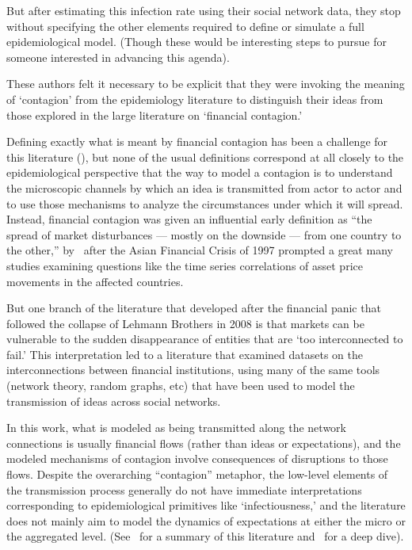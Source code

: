 But after estimating this infection rate using their social network data, they stop without specifying the other elements required to define or simulate a full epidemiological model.  (Though these would be interesting steps to pursue for someone interested in advancing this agenda).

These authors felt it necessary to be explicit that they were invoking the meaning of `contagion' from the epidemiology literature to distinguish their ideas from those explored in the large literature on `financial contagion.'

Defining exactly what is meant by financial contagion has been a challenge for this literature (\cite{pericoli2003primer}),  but none of the usual definitions correspond at all closely to the epidemiological perspective that the way to model a contagion is to understand the microscopic channels by which an idea is transmitted from actor to actor and to use those mechanisms to analyze the circumstances under which it will spread.  Instead, financial contagion was given an influential early definition as ``the spread of market disturbances — mostly on the downside —
from one country to the other,'' by~\cite{Dornbusch00contagionHow} after the Asian Financial Crisis of 1997 prompted a great many studies examining questions like the time series correlations of asset price movements in the affected countries.

But one branch of the literature that developed after the financial panic that followed the collapse of Lehmann Brothers in 2008 is that markets can be vulnerable to the sudden disappearance of entities that are `too interconnected to fail.' This interpretation led to a literature that examined datasets on the interconnections between financial institutions, using many of the same tools (network theory, random graphs, etc) that have been used to model the transmission of ideas across social networks.

In this work, what is modeled as being transmitted along the network connections is usually financial flows (rather than ideas or expectations), and the modeled mechanisms of contagion involve consequences of disruptions to those flows.  Despite the overarching ``contagion'' metaphor, the low-level elements of the transmission process generally do not have immediate interpretations corresponding to epidemiological primitives like `infectiousness,' and the literature does not mainly aim to model the dynamics of expectations at either the micro or the aggregated level.  (See~\cite{glasserman2016contagion} for a summary of this literature and~\cite{cabrales2015financial} for a deep dive).

